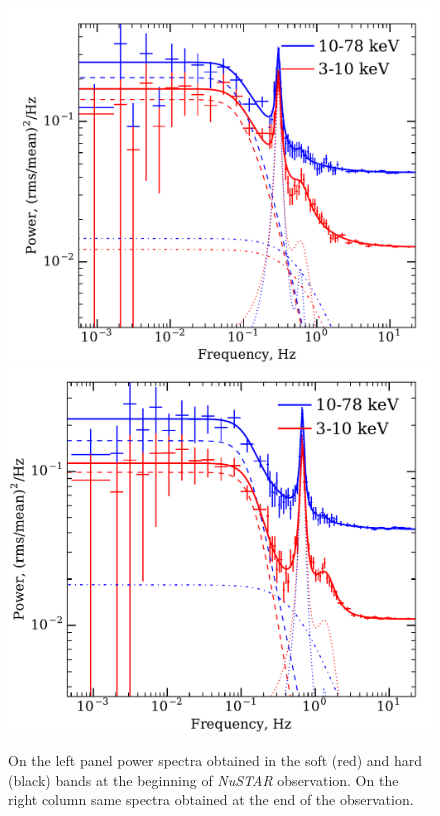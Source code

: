 \documentclass[a4paper,fleqn,usenatbib]{mnras}
\begin{document}
\begin{table}
\begin{figure}
        \includegraphics[trim=0 0 0 0.65cm, clip, width=\columnwidth]{NuFirst.pdf}
        \includegraphics[width=\columnwidth, height = 0.83\columnwidth]{NuLast.pdf}
        \caption{On the left panel power spectra obtained in the soft (red) and hard (black) bands at the beginning of {\it NuSTAR} observation. 
        On the right column same spectra obtained at the end of the observation.}
        \label{fig:ps_example}
\end{figure}


\end{table}
\end{document}
